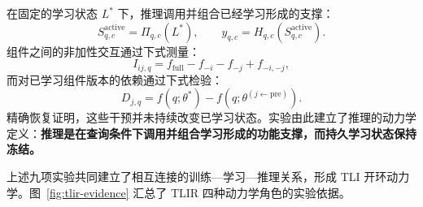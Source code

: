在固定的学习状态 $L^*$ 下，推理调用并组合已经学习形成的支撑：
\begin{equation}
 S_{q,c}^{\mathrm{active}}=\Pi_{q,c}(L^*),\qquad
 y_{q,c}=H_{q,c}(S_{q,c}^{\mathrm{active}}).
 \label{eq:inference}
\end{equation}
组件之间的非加性交互通过下式测量：
\begin{equation}
 I_{ij,q}=f_{\mathrm{full}}-f_{-i}-f_{-j}+f_{-i,-j},
 \label{eq:interaction}
\end{equation}
而对已学习组件版本的依赖通过下式检验：
\begin{equation}
 D_{j,q}=f(q;\theta^*)-f(q;\theta^{(j\leftarrow\mathrm{pre})}).
 \label{eq:rollback}
\end{equation}
精确恢复证明，这些干预并未持续改变已学习状态。实验由此建立了推理的动力学定义：\textbf{推理是在查询条件下调用并组合学习形成的功能支撑，而持久学习状态保持冻结。}

上述九项实验共同建立了相互连接的训练—学习—推理关系，形成 TLI 开环动力学。图~\ref{fig:tlir-evidence} 汇总了 TLIR 四种动力学角色的实验依据。
